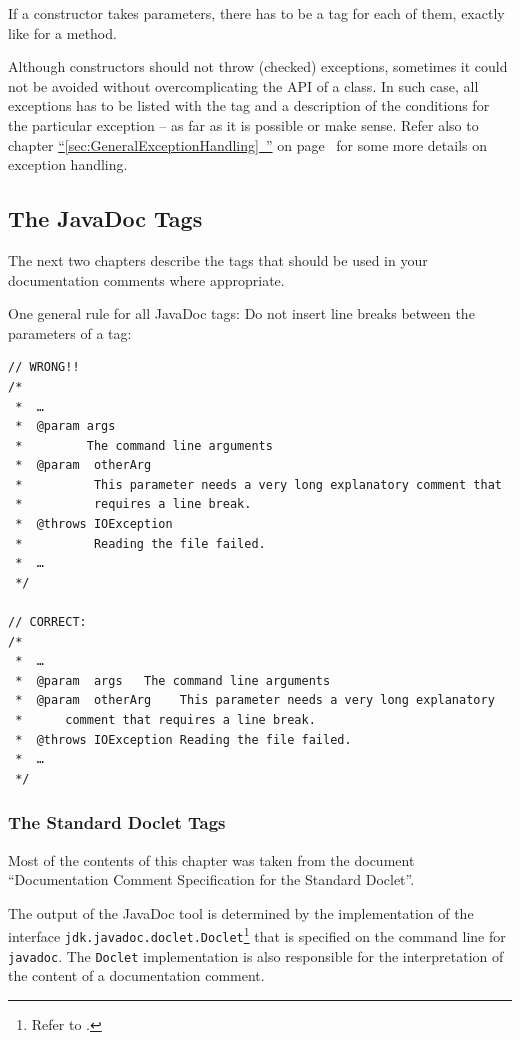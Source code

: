 \documentclass[11pt,a4paper, titlepage, parskip=half, headsepline, footsepline, cleardoublepage=current, headheight=1cm]{scrbook}
\newcommand*{\tqfullvref}[1]{\hyperref[{#1}]{“\ref*{#1}~\nameref*{#1}”} on page~\pageref{#1}}
\begin{document}
If a constructor takes parameters, there has to be a  tag for each of them, exactly like for a method.

Although constructors should not throw (checked) exceptions, sometimes it could not be avoided without overcomplicating the API of a class. In such case, all exceptions has to be listed with the  tag and a description of the conditions for the particular exception – as far as it is possible or make sense. Refer also to chapter \tqfullvref{sec:GeneralExceptionHandling} for some more details on exception handling.


\subsection{The JavaDoc Tags}\label{sec:JavaDocTags}
The next two chapters describe the tags that should be used in your documentation comments where appropriate.

One general rule for all JavaDoc tags: Do not insert line breaks between the parameters of a tag:
\begin{lstlisting}
// WRONG!!
/*
 *  …
 *  @param args
 *         The command line arguments
 *  @param  otherArg
 *          This parameter needs a very long explanatory comment that
 *          requires a line break.
 *  @throws IOException
 *          Reading the file failed.
 *  …
 */

// CORRECT:
/*
 *  …
 *  @param  args   The command line arguments
 *  @param  otherArg    This parameter needs a very long explanatory
 *      comment that requires a line break.
 *  @throws IOException Reading the file failed.
 *  …
 */
\end{lstlisting}


\subsubsection{The Standard Doclet Tags}
Most of the contents of this chapter was taken from the document “Documentation Comment Specification for the Standard Doclet”\autocite{ORACLE_DOC_JAVADOC_TAG}. 

The output of the JavaDoc tool is determined by the implementation of the interface \lstinline|jdk.javadoc.doclet.Doclet|\footnote{Refer to \autocite{ORACLE_DOC_DOCLET_INTERFACE}.} that is specified on the command line for \verb#javadoc#. The \lstinline|Doclet| implementation is also responsible for the interpretation of the content of a documentation comment.
\end{document}
